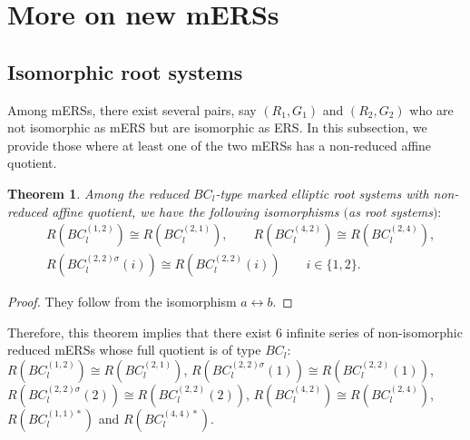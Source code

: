\documentclass[11pt]{amsart}
\newtheorem{thm}{Theorem}[section]
\begin{document}

\section{More on new mERSs}\label{sect:more-mERS}

\subsection{Isomorphic root systems}\label{sect:isom-root-sys}
Among mERSs, there exist several pairs, say $(R_1,G_1)$ and $(R_2,G_2)$ who are not isomorphic as mERS but are isomorphic as ERS. In this subsection, we provide those  where at least one of the two mERSs has a non-reduced affine quotient. 

\begin{thm} \label{thm:isom-red-mERS-nred_root-sys} Among the reduced $BC_l$-type marked elliptic root systems with non-reduced affine quotient, we have the following isomorphisms
$($as root systems$):$
\begin{align*}
&R(BC_l^{(1,2)}) \cong R(BC_l^{(2,1)}), \qquad R(BC_l^{(4,2)}) \cong R(BC_l^{(2,4)}), \\
&R(BC_l^{(2,2)\sigma}(i)) \cong R(BC_l^{(2,2)}(i)) \qquad i \in \{1,2\}.
\end{align*}

\end{thm}
\medskip


\begin{proof}They follow from the isomorphism $a \leftrightarrow b$.
\end{proof}

Therefore, this theorem implies that there exist $6$ infinite series of non-isomorphic reduced mERSs whose full quotient is of type $BC_l$: 
$R(BC_l^{(1,2)}) \cong R(BC_l^{(2,1)})$, 
$R(BC_l^{(2,2)\sigma}(1)) \cong R(BC_l^{(2,2)}(1))$, $R(BC_l^{(2,2)\sigma}(2)) \cong R(BC_l^{(2,2)}(2))$, $R(BC_l^{(4,2)}) \cong R(BC_l^{(2,4)})$, $R(BC_l^{(1,1)\ast})$ and $R(BC_l^{(4,4)\ast})$.\\


\smallskip
\end{document}
